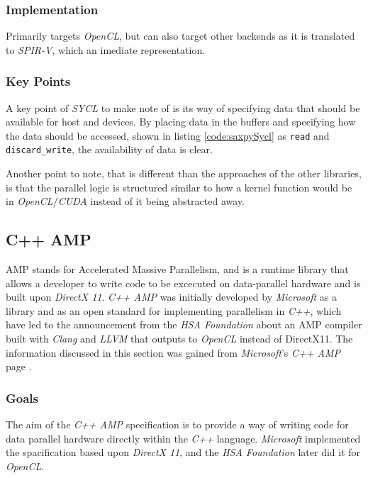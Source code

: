 \subsubsection{Implementation}
Primarily targets \textit{OpenCL}, but can also target other backends as it is translated to \textit{SPIR-V}, which an imediate representation.

\subsubsection{Key Points}
A key point of \textit{SYCL} to make note of is its way of specifying data that should be available for host and devices. By placing data in the buffers and specifying how the data should be accessed, shown in listing \ref{code:saxpySycl} as \texttt{read} and \texttt{discard\_write}, the availability of data is clear. 

Another point to note, that is different than the approaches of the other libraries, is that the parallel logic is structured similar to how a kernel function would be in \textit{OpenCL}/\textit{CUDA} instead of it being abstracted away.


\subsection{C++ AMP}
AMP stands for Accelerated Massive Parallelism, and is a runtime library that allows a developer to write code to be excecuted on data-parallel hardware and is built upon \textit{DirectX 11}. \textit{C++ AMP} was initially developed by \textit{Microsoft} as a library and as an open standard for implementing parallelism in \textit{C++}, which have led to the announcement from the \textit{HSA Foundation} about an AMP compiler built with \textit{Clang} and \textit{LLVM} that outputs to \textit{OpenCL} instead of DirectX11. The information discussed in this section was gained from \textit{Microsoft}'s \textit{C++ AMP} page \cite{microsoftCppAMP}.

\subsubsection{Goals}
The aim of the \textit{C++ AMP} specification is to provide a way of writing code for data parallel hardware directly within the \textit{C++} language. \textit{Microsoft} implemented the spacification based upon \textit{DirectX 11}, and the \textit{HSA Foundation} later did it for \textit{OpenCL}.

